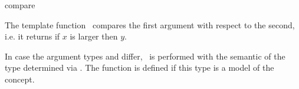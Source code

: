 \begin{ccRefFunction}{compare}

\ccDefinition

The template function \ccRefName\ compares the first argument with respect to
the second, i.e. it returns  if $x$ is larger then $y$. 

In case the argument types  and  differ, 
\ccRefName\ is performed with the semantic of the type determined via
.
The function is defined if this type
is a model of the  concept. 



\\
\\

\end{ccRefFunction}
